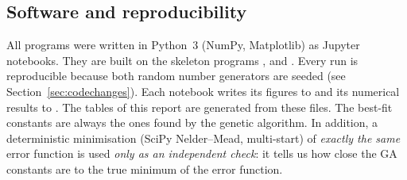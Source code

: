 \subsection{Software and reproducibility}
All programs were written in Python~3 (NumPy, Matplotlib) as Jupyter notebooks. They are built on the
skeleton programs ,  and . Every run is
reproducible because both random number generators are seeded (see Section~\ref{sec:codechanges}). Each
notebook writes its figures to  and its numerical results to .
The tables of this report are generated from these files.
The best-fit constants are always the ones found by the genetic algorithm. In addition, a deterministic
minimisation (SciPy Nelder--Mead, multi-start) of \emph{exactly the same} error function is used
\emph{only as an independent check}: it tells us how close the GA constants are to the true minimum of
the error function.

